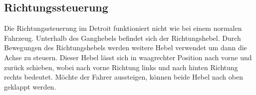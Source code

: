 \subsection{Richtungssteuerung}

Die Richtungssteuerung im Detroit funktioniert nicht wie bei einem normalen Fahrzeug. Unterhalb des Ganghebels befindet sich der Richtungshebel. Durch Bewegungen des Richtungshebels werden weitere Hebel verwendet um dann die Achse zu steuern. Dieser Hebel lässt sich in waagrechter Position nach vorne und zurück schieben, wobei nach vorne Richtung links und nach hinten Richtung rechts bedeutet. Möchte der Fahrer aussteigen, können beide Hebel nach oben geklappt werden.


\newpage